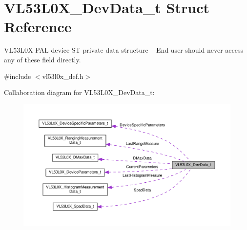 \hypertarget{structVL53L0X__DevData__t}{}\section{V\+L53\+L0\+X\+\_\+\+Dev\+Data\+\_\+t Struct Reference}
\label{structVL53L0X__DevData__t}


V\+L53\+L0X P\+AL device ST private data structure ~\newline
End user should never access any of these field directly.  




{\ttfamily \#include $<$vl53l0x\+\_\+def.\+h$>$}



Collaboration diagram for V\+L53\+L0\+X\+\_\+\+Dev\+Data\+\_\+t\+:\nopagebreak
\begin{figure}[H]
\begin{center}
\leavevmode
\includegraphics[width=350pt]{structVL53L0X__DevData__t__coll__graph}
\end{center}
\end{figure}

